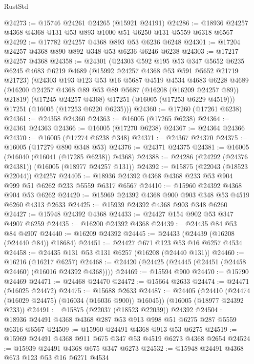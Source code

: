 \begin{lexlean}{RustStd}
\begin{coremodule}
@24273 := @15746 @24261 @24265 (@15921 @24191)
@24286 := @18936 @24257 @4368 @4368 @131 @53 @893 @1000 @51 @6250 @131 @5559 @6318 @6567
@24292 := @17782 @24257 @4368 @893 @53 @6236 @6248
@24301 := @17204 @24257 @4368 @890 @892 @348 @53 @6236 @6246 @6238
@24303 := @17217 @24257 @4368
@24358 := @24301
    (@24303
      @592
      @195
      @53
      @347
      @5652
      @6235
      @6245
      @4683
      @6219
      @4689
      (@15992 @24257 @4368 @53 @591 @5652 @21719 @21723)
      (@24303
        @193
        @123
        @53
        @16
        @5687
        @4519
        @4534
        @4683
        @6228
        @4689
        (@16200 @24257 @4368 @89 @53 @89 @5687 (@16208 (@16209 @24257 @89)) @21819)
        (@17245 @24257 @4368)
        @17251
        (@16005 (@17253 @6229 @4519)))
      @17251
      (@16005 (@17253 @6220 @6235)))
@24360 := @17260 (@17261 @6238)
@24361 := @24358 @24360
@24363 := @16005 (@17265 @6238)
@24364 := @24361 @24363
@24366 := @16005 (@17270 @6238)
@24367 := @24364 @24366
@24370 := @16005 (@17274 @6238 @348)
@24371 := @24367 @24370
@24375 := @16005 (@17279 @890 @348 @53)
@24376 := @24371 @24375
@24381 := @16005 (@16040 (@16041 (@17285 @6238)) @4368)
@24388 := @24286 (@24292 (@24376 @24381)) (@16005 (@18977 @24257 @131))
@24392 := @15875 (@22043 (@18523 @22044)) @24257
@24405 := @18936 @24392 @4368 @4368 @233 @53 @904 @999 @51 @6262 @233 @5559 @6317 @6567
@24410 := @15960 @24392 @4368 @904 @53 @6262
@24420 := @15969 @24392 @4368 @900 @903 @348 @53 @4519 @6260 @4313 @2633
@24425 := @15939 @24392 @4368 @903 @348 @6260
@24427 := @15948 @24392 @4368
@24433 := @24427 @154 @902 @53 @347 @4907 @6259
@24435 := @16200 @24392 @4368
@24439 := @24435 @84 @53 @84 @4907
@24440 := @16209 @24392
@24445 := @24433 (@24439 (@16208 (@24440 @84)) @18684)
@24451 := @24427 @671 @123 @53 @16 @6257 @4534
@24458 := @24435 @131 @53 @131 @6257 (@16208 (@24440 @131))
@24460 := @16216 (@16217 @6257)
@24468 := @24420 (@24425 (@24445 (@24451 (@24458 @24460) (@16016 @24392 @4368))))
@24469 := @15594 @900
@24470 := @15790 @24469
@24471 := @24468 @24470
@24472 := @15664 @2633
@24474 := @24471 (@16025 @24472)
@24475 := @15688 @2633
@24487 := @24405
    (@24410 (@24474 (@16029 @24475) (@16034 (@16036 @900)) @16045))
    (@16005 (@18977 @24392 @233))
@24491 := @15875 (@22037 (@18523 @22039)) @24392
@24504 := @18936 @24491 @4368 @4368 @287 @53 @913 @998 @51 @6275 @287 @5559 @6316 @6567
@24509 := @15960 @24491 @4368 @913 @53 @6275
@24519 := @15969 @24491 @4368 @911 @675 @347 @53 @4519 @6273 @4368 @2654
@24524 := @15939 @24491 @4368 @675 @347 @6273
@24532 := @15948 @24491 @4368 @673 @123 @53 @16 @6271 @4534

\end{coremodule}
\end{lexlean}
